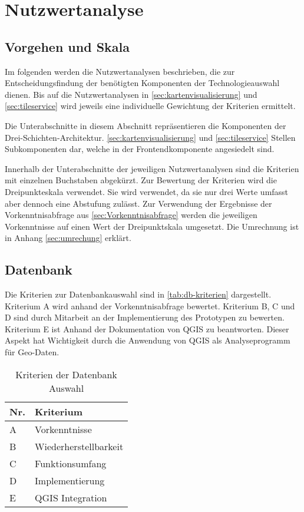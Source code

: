 \section{Nutzwertanalyse}
\label{sec:Nutzertanalyse}

\subsection{Vorgehen und Skala}
Im folgenden werden die Nutzwertanalysen beschrieben, die zur Entscheidungsfindung der benötigten Komponenten der Technologieauswahl dienen.
Bis auf die Nutzwertanalysen in \autoref{sec:kartenvisualisierung}  und \autoref{sec:tileservice}  wird jeweils eine individuelle Gewichtung der Kriterien ermittelt.

Die Unterabschnitte in diesem Abschnitt repräsentieren die Komponenten der Drei-Schichten-Architektur.
\autoref{sec:kartenvisualisierung}  und \autoref{sec:tileservice}  Stellen Subkomponenten dar, welche in der Frontendkomponente angesiedelt sind.
	
Innerhalb der Unterabschnitte der jeweiligen Nutzwertanalysen sind die Kriterien mit einzelnen Buchstaben abgekürzt.
Zur Bewertung der Kriterien wird die Dreipunkteskala verwendet.
Sie wird verwendet, da sie nur drei Werte umfasst aber dennoch eine Abstufung zulässt.
Zur Verwendung der Ergebnisse der Vorkenntnisabfrage aus \autoref{sec:Vorkenntnisabfrage} werden die jeweiligen Vorkenntnisse auf einen Wert der Dreipunktskala umgesetzt.
Die Umrechnung ist in Anhang \ref{sec:umrechung} erklärt.

\subsection{Datenbank}
Die Kriterien zur Datenbankauswahl sind in \autoref{tab:db-kriterien} dargestellt.
Kriterium A wird anhand der Vorkenntnisabfrage bewertet.
Kriterium B, C und D sind durch Mitarbeit an der Implementierung des Prototypen zu bewerten.
Kriterium E ist Anhand der Dokumentation von QGIS zu beantworten.
Dieser Aspekt hat Wichtigkeit durch die Anwendung von QGIS als Analyseprogramm für Geo-Daten.

\begin{table}[h]
	\caption{Kriterien der Datenbank Auswahl}
	\begin{center}
		\begin{tabular}{ll}
			\toprule
			Nr. & Kriterium             \\ \midrule
			A   & Vorkenntnisse         \\
			B   & Wiederherstellbarkeit \\
			C   & Funktionsumfang       \\
			D   & Implementierung       \\
			E   & QGIS Integration      \\ \bottomrule
		\end{tabular}
	\end{center}
	\label{tab:db-kriterien}
\end{table}

